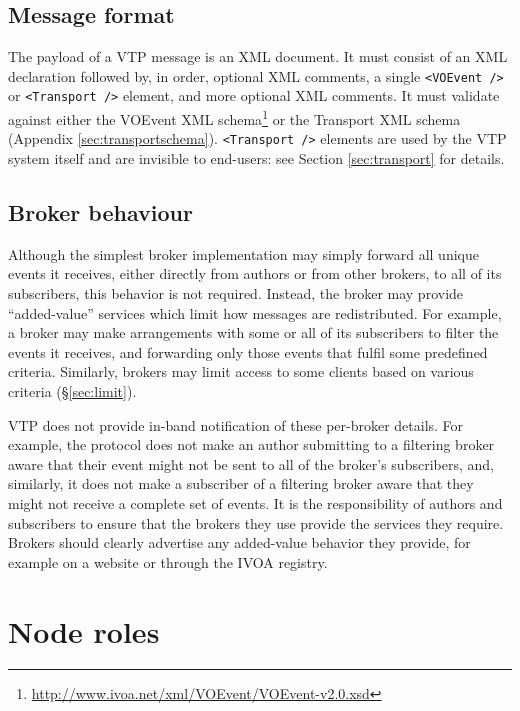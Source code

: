 \documentclass[a4paper,11pt]{ivoa}
\begin{document}
\subsection{Message format}
\label{sec:common:format}

The payload of a VTP message is an XML document. It must consist of an XML
declaration followed by, in order, optional XML comments, a single
\texttt{<VOEvent~/>} or \texttt{<Transport~/>} element, and more optional XML
comments. It must validate against either the VOEvent XML
schema\footnote{\url{http://www.ivoa.net/xml/VOEvent/VOEvent-v2.0.xsd}} or the
Transport XML schema (Appendix \ref{sec:transportschema}).
\texttt{<Transport~/>} elements are used by the VTP system itself and are
invisible to end-users: see Section \ref{sec:transport} for details.

\subsection{Broker behaviour}
\label{sec:common:broker}

Although the simplest broker implementation may simply forward all unique
events it receives, either directly from authors or from other brokers, to all
of its subscribers, this behavior is not required. Instead, the broker may
provide ``added-value'' services which limit how messages are redistributed.
For example, a broker may make arrangements with some or all of its
subscribers to filter the events it receives, and forwarding only those events
that fulfil some predefined criteria. Similarly, brokers may limit access to
some clients based on various criteria (\S\ref{sec:limit}).

VTP does not provide in-band notification of these per-broker details. For
example, the protocol does not make an author submitting to a filtering broker
aware that their event might not be sent to all of the broker's subscribers,
and, similarly, it does not make a subscriber of a filtering broker aware that
they might not receive a complete set of events. It is the responsibility of
authors and subscribers to ensure that the brokers they use provide the
services they require. Brokers should clearly advertise any added-value
behavior they provide, for example on a website or through the IVOA registry.

\section{Node roles}
\label{sec:noderoles}
\end{document}
